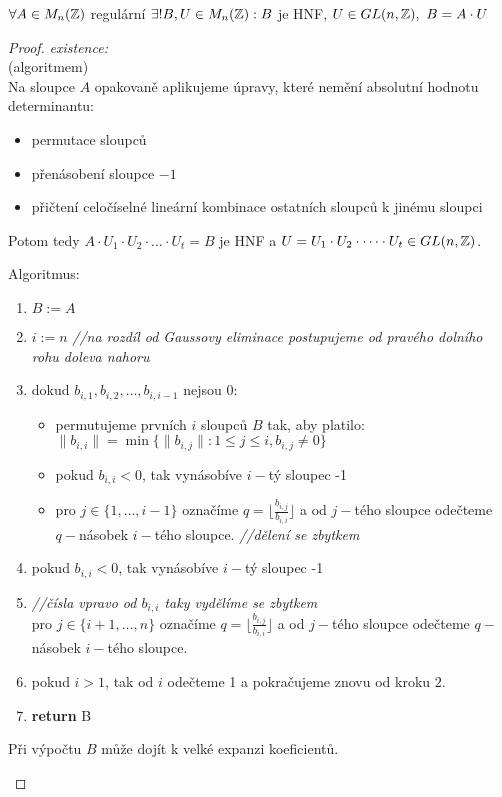 \begin{theorem}
    $\forall A \in M_n(\operatorname{\mathbb{Z}})$ regulární $\exists ! B,U\in M_{n}(\operatorname{\mathbb{Z}}): B$ je HNF, $U \in GL(n,\operatorname{\mathbb{Z}}),\ B = A \cdot U$
\end{theorem}
\begin{proof}
    \emph{existence:}\\
    (algoritmem)\\
    Na sloupce $A$ opakovaně aplikujeme úpravy, které nemění absolutní hodnotu determinantu:
    \begin{itemize}
        \item permutace sloupců
        \item přenásobení sloupce $-1$
        \item přičtení celočíselné lineární kombinace ostatních sloupců k jinému sloupci
    \end{itemize}
    Potom tedy $A\cdot U_1 \cdot U_2 \cdot \dots \cdot U_t = B$ je HNF a $U = U_1 \cdot U_2 \cdot \dots \cdot U_t \in GL(n,\operatorname{\mathbb{Z}})$.

    Algoritmus:\\
    \begin{enumerate}
        \item $B:= A$
        \item $i:=n$ \textit{//na rozdíl od Gaussovy eliminace postupujeme od pravého dolního rohu doleva nahoru}
        \item dokud $b_{i,1}, b_{i,2}, \dots, b_{i,i-1}$ nejsou $0$:
        \begin{itemize}
            \item permutujeme prvních $i$ sloupců $B$ tak, aby platilo: $\|b_{i,i}\| = \min\{\|b_{i,j}\|: 1 \leq j \leq i, b_{i,j} \neq 0\}$
            \item pokud $b_{i,i} < 0$, tak vynásobíve $i-$tý sloupec -1
            \item pro $j \in \{1, \dots, i-1\}$ označíme $q = \lfloor \frac{b_{i,j}}{b_{i,i}} \rfloor$ a od $j-$tého sloupce odečteme $q-$násobek $i-$tého sloupce. \textit{//dělení se zbytkem}
        \end{itemize}
        \item pokud $b_{i,i} < 0$, tak vynásobíve $i-$tý sloupec -1
        \item \textit{//čísla vpravo od $b_{i,i}$ taky vydělíme se zbytkem}\\
        pro $j \in \{i+1, \dots, n\}$ označíme $q = \lfloor \frac{b_{i,j}}{b_{i,i}} \rfloor$ a od $j-$tého sloupce odečteme $q-$násobek $i-$tého sloupce.
        \item pokud $i>1$, tak od $i$ odečteme 1 a pokračujeme znovu od kroku $2.$
        \item \textbf{return} B
    \end{enumerate}
    \begin{note}
        Při výpočtu $B$ může dojít k velké expanzi koeficientů.
    \end{note}


\end{proof}
